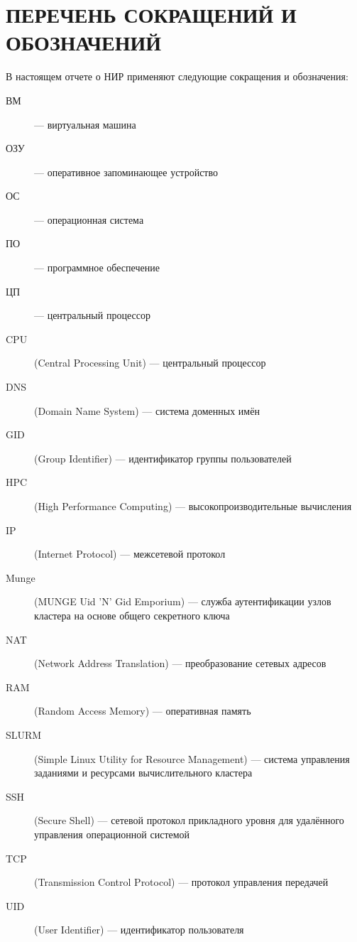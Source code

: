 \newpage
\section*{ПЕРЕЧЕНЬ СОКРАЩЕНИЙ И ОБОЗНАЧЕНИЙ}
В настоящем отчете о НИР применяют следующие сокращения и обозначения:
\begin{description}
\item[ВМ] --- виртуальная машина
\item[ОЗУ] --- оперативное запоминающее устройство
\item[ОС] --- операционная система
\item[ПО] --- программное обеспечение
\item[ЦП] --- центральный процессор
\item[CPU] (Central Processing Unit) --- центральный процессор
\item[DNS] (Domain Name System) --- система доменных имён
\item[GID] (Group Identifier) --- идентификатор группы пользователей
\item[HPC] (High Performance Computing) --- высокопроизводительные вычисления
\item[IP] (Internet Protocol) --- межсетевой протокол
\item[Munge] (MUNGE Uid 'N' Gid Emporium) --- служба аутентификации узлов кластера на основе общего секретного ключа
\item[NAT] (Network Address Translation) --- преобразование сетевых адресов
\item[RAM] (Random Access Memory) --- оперативная память
\item[SLURM] (Simple Linux Utility for Resource Management) --- система управления заданиями и ресурсами вычислительного кластера
\item[SSH] (Secure Shell) --- сетевой протокол прикладного уровня для удалённого управления операционной системой
\item[TCP] (Transmission Control Protocol) --- протокол управления передачей
\item[UID] (User Identifier) --- идентификатор пользователя
\end{description}